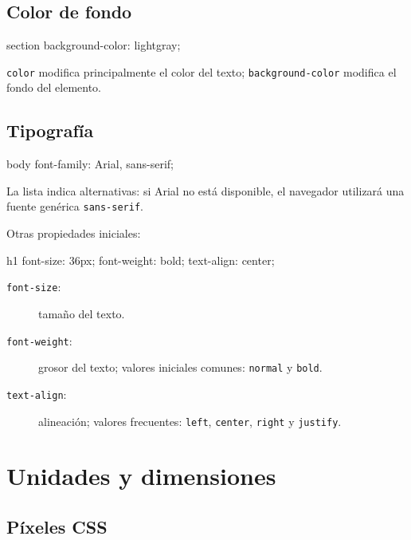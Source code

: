 \documentclass[11pt]{article}
\begin{document}
    \subsection{Color de fondo}

    \begin{csscodedark}
        section {
            background-color: lightgray;
        }
    \end{csscodedark}

    \texttt{color} modifica principalmente el color del texto; \texttt{background-color} modifica el fondo del elemento.

    \subsection{Tipografía}

    \begin{csscodedark}
        body {
            font-family: Arial, sans-serif;
        }
    \end{csscodedark}

    La lista indica alternativas: si Arial no está disponible, el navegador utilizará una fuente genérica \texttt{sans-serif}.

    Otras propiedades iniciales:

    \begin{csscodedark}
        h1 {
            font-size: 36px;
            font-weight: bold;
            text-align: center;
        }
    \end{csscodedark}

    \begin{description}
        \item[\texttt{font-size}:] tamaño del texto.
        \item[\texttt{font-weight}:] grosor del texto; valores iniciales comunes: \texttt{normal} y \texttt{bold}.
        \item[\texttt{text-align}:] alineación; valores frecuentes: \texttt{left}, \texttt{center}, \texttt{right} y \texttt{justify}.
    \end{description}

    \section{Unidades y dimensiones}

    \subsection{Píxeles CSS}
\end{document}

